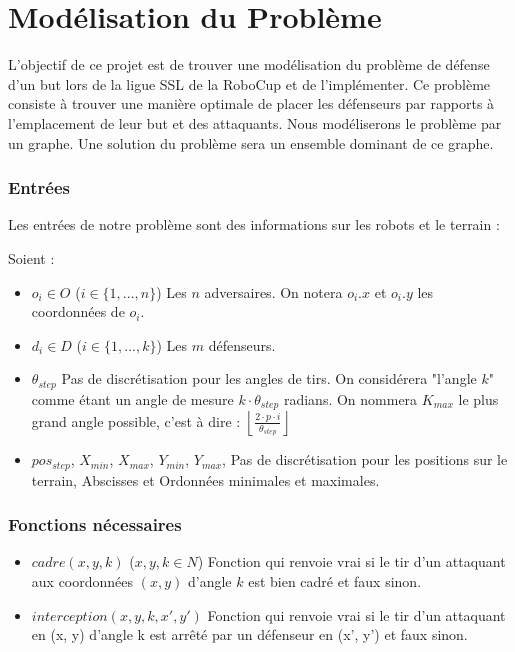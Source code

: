 \part{Modélisation du Problème}

L'objectif de ce projet est de trouver une modélisation du problème de défense d'un but lors de la ligue SSL de la RoboCup et de l'implémenter. Ce problème consiste à trouver une manière optimale de placer les défenseurs par rapports à l'emplacement de leur but et des attaquants. Nous modéliserons le problème par un graphe. Une solution du problème sera un ensemble dominant de ce graphe.


\section{Entrées}
Les entrées de notre problème sont des informations sur les robots et le terrain :

Soient :
\begin{itemize}
\item $o_i \in O$ ($i \in \{1,..., n\}$) Les $n$ adversaires. On notera $o_i.x$ et $o_i.y$ les coordonnées de $o_i$.
\item $d_i \in D$ ($i \in \{1,..., k\}$) Les $m$ défenseurs.
\item $\theta_{step}$ Pas de discrétisation pour les angles de tirs. On considérera "l'angle $k$" comme étant un angle de mesure $k \cdot \theta_{step}$ radians. On nommera $K_{max}$ le plus grand angle possible, c'est à dire :  $\left \lfloor{\frac{2\cdot p \cdot i }{\theta_{step}}}\right \rfloor $
\item $pos_{step}$, $X_{min}$, $X_{max}$, $Y_{min}$, $Y_{max}$, Pas de discrétisation pour les positions sur le terrain, Abscisses et Ordonnées minimales et maximales.
\end{itemize}

\section{Fonctions nécessaires}
\begin{itemize}
\item $cadre(x, y, k)$ ($x, y, k \in N$) Fonction qui renvoie vrai si le tir d'un attaquant aux coordonnées $(x, y)$ d'angle $k$ est bien cadré et faux sinon.
\item $interception(x, y, k, x', y')$ Fonction qui renvoie vrai si le tir d'un attaquant en (x, y) d'angle k est arrêté par un défenseur en (x', y') et faux sinon.
\end{itemize}
\space
\space

